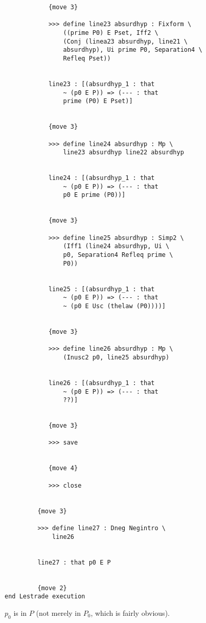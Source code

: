 \documentclass[12pt]{article}
\begin{document}
\begin{verbatim}
            {move 3}

            >>> define line23 absurdhyp : Fixform \
                ((prime P0) E Pset, Iff2 \
                (Conj (linea23 absurdhyp, line21 \
                absurdhyp), Ui prime P0, Separation4 \
                Refleq Pset))


            line23 : [(absurdhyp_1 : that 
                ~ (p0 E P)) => (--- : that 
                prime (P0) E Pset)]


            {move 3}

            >>> define line24 absurdhyp : Mp \
                line23 absurdhyp line22 absurdhyp


            line24 : [(absurdhyp_1 : that 
                ~ (p0 E P)) => (--- : that 
                p0 E prime (P0))]


            {move 3}

            >>> define line25 absurdhyp : Simp2 \
                (Iff1 (line24 absurdhyp, Ui \
                p0, Separation4 Refleq prime \
                P0))


            line25 : [(absurdhyp_1 : that 
                ~ (p0 E P)) => (--- : that 
                ~ (p0 E Usc (thelaw (P0))))]


            {move 3}

            >>> define line26 absurdhyp : Mp \
                (Inusc2 p0, line25 absurdhyp)


            line26 : [(absurdhyp_1 : that 
                ~ (p0 E P)) => (--- : that 
                ??)]


            {move 3}

            >>> save


            {move 4}

            >>> close


         {move 3}

         >>> define line27 : Dneg Negintro \
             line26


         line27 : that p0 E P


         {move 2}
end Lestrade execution
\end{verbatim}

$p_0$ is in $P$ (not merely in $P_0$, which is fairly obvious).
\end{document}
